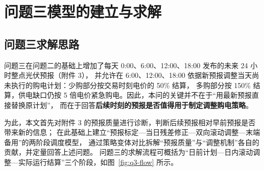 \section{问题三模型的建立与求解}

\subsection{问题三求解思路}
问题三在问题二的基础上增加了每天 0:00、6:00、12:00、18:00 发布的未来 24 小时整点光伏预报（附件 3），
并允许在 6:00、12:00、18:00 依据新预报调整当天尚未执行的购电计划：少购部分按交易时刻电价的 50\% 结算，
多购部分按 150\% 结算，供电缺口仍按 5 倍电价紧急购电。因此，本问的关键并不在于“用最新预报直接替换原计划”，
而在于回答\textbf{后续时刻的预报是否值得用于制定调整购电策略}。

为此，本文首先对附件 3 的预报质量进行诊断，判断后续预报相对早前预报是否带来新的信息；
在此基础上建立“预报标定—当日残差修正—双向滚动调整—末端备用”的两阶段调度模型，
通过策略变体对比拆解“预报质量”与“调整机制”各自的贡献，并定量回答上述问题。
问题三的求解流程可概括为“日前计划—日内滚动调整—实际运行结算”三个阶段，如图~\ref{fig:q3-flow} 所示。

